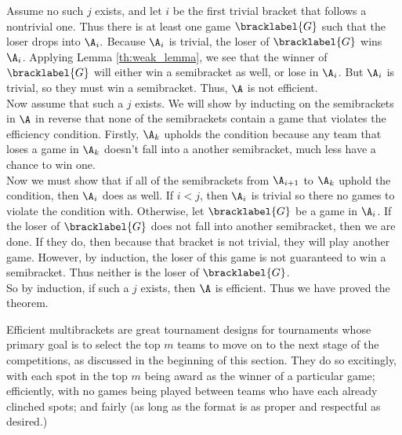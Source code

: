 {{        Assume no such $j$ exists, and let $i$ be the first trivial bracket that follows a nontrivial one. Thus there is at least one game $\bracklabel{G}$ such that the loser drops into $\A_i.$ Because $\A_i$ is trivial, the loser of $\bracklabel{G}$ wins $\A_i$. Applying Lemma \ref{th:weak_lemma}, we see that the winner of $\bracklabel{G}$ will either win a semibracket as well, or lose in $\A_i$. But $\A_i$ is trivial, so they must win a semibracket. Thus, $\A$ is not efficient.\\

        Now assume that such a $j$ exists. We will show by inducting on the semibrackets in $\A$ in reverse that none of the semibrackets contain a game that violates the efficiency condition. Firstly, $\A_k$ upholds the condition because any team that loses a game in $\A_k$ doesn't fall into a another semibracket, much less have a chance to win one.\\
        
        Now we must show that if all of the semibrackets from $\A_{i+1}$ to $\A_k$ uphold the condition, then $\A_i$ does as well. If $i<j$, then $\A_i$ is trivial so there no games to violate the condition with. Otherwise, let $\bracklabel{G}$ be a game in $\A_i$. If the loser of $\bracklabel{G}$ does not fall into another semibracket, then we are done. If they do, then because that bracket is not trivial, they will play another game. However, by induction, the loser of this game is not guaranteed to win a semibracket. Thus neither is the loser of $\bracklabel{G}$.\\

        So by induction, if such a $j$ exists, then $\A$ is efficient. Thus we have proved the theorem.
    }{}

    Efficient multibrackets are great tournament designs for tournaments whose primary goal is to select the top $m$ teams to move on to the next stage of the competitions, as discussed in the beginning of this section. They do so excitingly, with each spot in the top $m$ being award as the winner of a particular game; efficiently, with no games being played between teams who have each already clinched spots; and fairly (as long as the format is as proper and respectful as desired.)
}